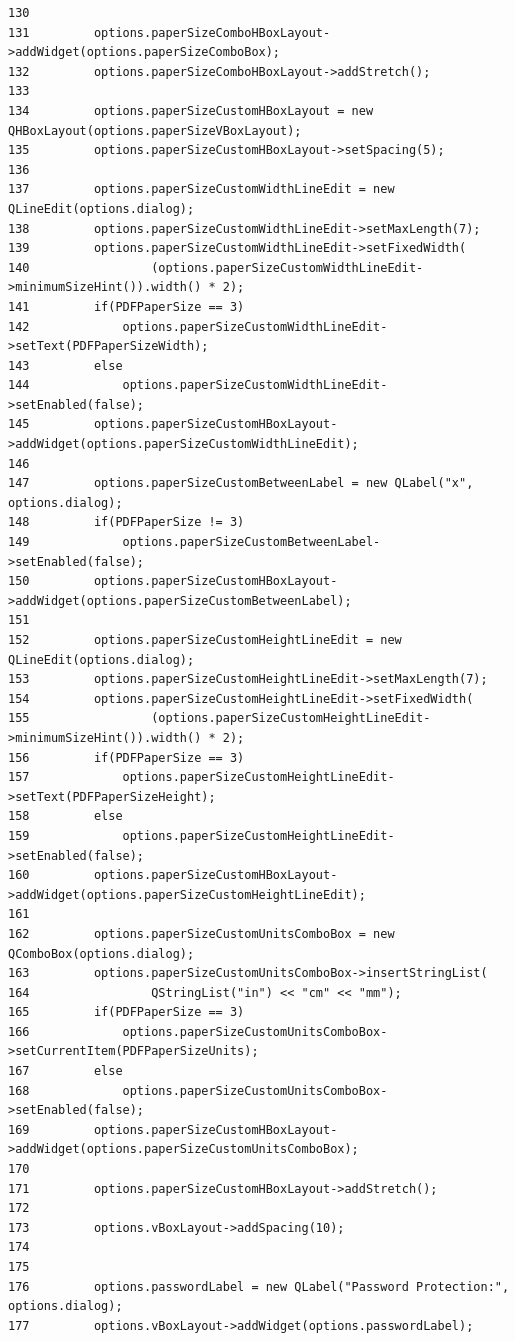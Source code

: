 \begin{verbatim}
130 
131         options.paperSizeComboHBoxLayout->addWidget(options.paperSizeComboBox);
132         options.paperSizeComboHBoxLayout->addStretch();
133 
134         options.paperSizeCustomHBoxLayout = new QHBoxLayout(options.paperSizeVBoxLayout);
135         options.paperSizeCustomHBoxLayout->setSpacing(5);
136 
137         options.paperSizeCustomWidthLineEdit = new QLineEdit(options.dialog);
138         options.paperSizeCustomWidthLineEdit->setMaxLength(7);
139         options.paperSizeCustomWidthLineEdit->setFixedWidth(
140                 (options.paperSizeCustomWidthLineEdit->minimumSizeHint()).width() * 2);
141         if(PDFPaperSize == 3)
142             options.paperSizeCustomWidthLineEdit->setText(PDFPaperSizeWidth);
143         else
144             options.paperSizeCustomWidthLineEdit->setEnabled(false);
145         options.paperSizeCustomHBoxLayout->addWidget(options.paperSizeCustomWidthLineEdit);
146 
147         options.paperSizeCustomBetweenLabel = new QLabel("x", options.dialog);
148         if(PDFPaperSize != 3)
149             options.paperSizeCustomBetweenLabel->setEnabled(false);
150         options.paperSizeCustomHBoxLayout->addWidget(options.paperSizeCustomBetweenLabel);
151 
152         options.paperSizeCustomHeightLineEdit = new QLineEdit(options.dialog);
153         options.paperSizeCustomHeightLineEdit->setMaxLength(7);
154         options.paperSizeCustomHeightLineEdit->setFixedWidth(
155                 (options.paperSizeCustomHeightLineEdit->minimumSizeHint()).width() * 2);
156         if(PDFPaperSize == 3)
157             options.paperSizeCustomHeightLineEdit->setText(PDFPaperSizeHeight);
158         else
159             options.paperSizeCustomHeightLineEdit->setEnabled(false);
160         options.paperSizeCustomHBoxLayout->addWidget(options.paperSizeCustomHeightLineEdit);
161 
162         options.paperSizeCustomUnitsComboBox = new QComboBox(options.dialog);
163         options.paperSizeCustomUnitsComboBox->insertStringList(
164                 QStringList("in") << "cm" << "mm");
165         if(PDFPaperSize == 3)
166             options.paperSizeCustomUnitsComboBox->setCurrentItem(PDFPaperSizeUnits);
167         else
168             options.paperSizeCustomUnitsComboBox->setEnabled(false);
169         options.paperSizeCustomHBoxLayout->addWidget(options.paperSizeCustomUnitsComboBox);
170 
171         options.paperSizeCustomHBoxLayout->addStretch();
172 
173         options.vBoxLayout->addSpacing(10);
174 
175 
176         options.passwordLabel = new QLabel("Password Protection:", options.dialog);
177         options.vBoxLayout->addWidget(options.passwordLabel);

\end{verbatim}

